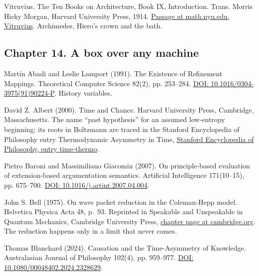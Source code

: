 \documentclass[11pt,twoside]{article}
\theoremstyle{thielethm}
\theoremstyle{thieledef}
\theoremstyle{thieledef}
\theoremstyle{thieledef}
\theoremstyle{thielethm}
\theoremstyle{thieleobs}
\theoremstyle{thielethm}
\begin{document}
\noindent Vitruvius. The Ten Books on Architecture, Book IX, Introduction. Trans. Morris Hicky Morgan, Harvard University Press, 1914. \href{https://math.nyu.edu/Archimedes/Crown/Vitruvius.html}{Passage at math.nyu.edu, Vitruvius}. Archimedes, Hiero's crown and the bath.
\par\medskip

\subsection*{Chapter 14. A box over any machine}

\noindent Mart\'in Abadi and Leslie Lamport (1991). The Existence of Refinement Mappings. Theoretical Computer Science 82(2), pp. 253--284. \href{https://doi.org/10.1016/0304-3975(91)90224-P}{DOI: 10.1016/0304-3975(91)90224-P}. History variables.
\par\medskip

\noindent David Z. Albert (2000). Time and Chance. Harvard University Press, Cambridge, Massachusetts. The name ``past hypothesis'' for an assumed low-entropy beginning; its roots in Boltzmann are traced in the Stanford Encyclopedia of Philosophy entry Thermodynamic Asymmetry in Time, \href{https://plato.stanford.edu/entries/time-thermo/}{Stanford Encyclopedia of Philosophy, entry time-thermo}.
\par\medskip

\noindent Pietro Baroni and Massimiliano Giacomin (2007). On principle-based evaluation of extension-based argumentation semantics. Artificial Intelligence 171(10--15), pp. 675--700. \href{https://doi.org/10.1016/j.artint.2007.04.004}{DOI: 10.1016/j.artint.2007.04.004}.
\par\medskip

\noindent John S. Bell (1975). On wave packet reduction in the Coleman-Hepp model. Helvetica Physica Acta 48, p.~93. Reprinted in Speakable and Unspeakable in Quantum Mechanics, Cambridge University Press, \href{https://www.cambridge.org/core/books/speakable-and-unspeakable-in-quantum-mechanics/on-wave-packet-reduction-in-the-colemanhepp-model/95A04BE1845F5490A462D929930CA7E8}{chapter page at cambridge.org}. The reduction happens only in a limit that never comes.
\par\medskip

\noindent Thomas Blanchard (2024). Causation and the Time-Asymmetry of Knowledge. Australasian Journal of Philosophy 102(4), pp. 959--977. \href{https://doi.org/10.1080/00048402.2024.2328629}{DOI: 10.1080/00048402.2024.2328629}.
\par\medskip
\end{document}
